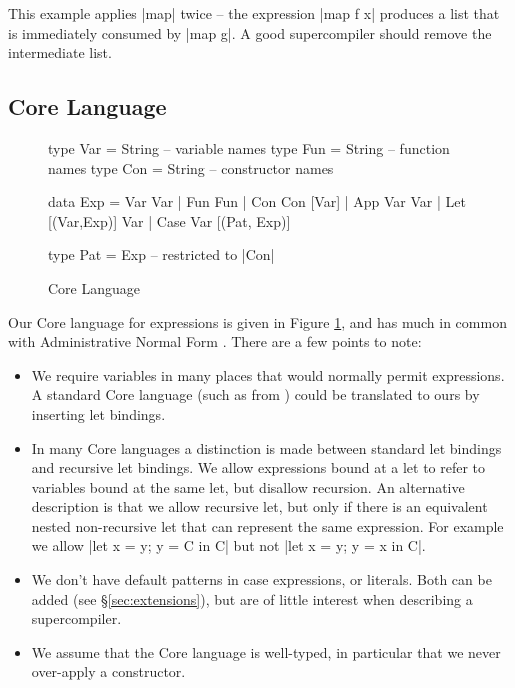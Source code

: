 \documentclass[draft]{sigplanconf}
\begin{document}
This example applies |map| twice -- the expression |map f x| produces a list that is immediately consumed by |map g|. A good supercompiler should remove the intermediate list.

\subsection{Core Language}
\label{sec:core}

\begin{figure}
\begin{code}
type Var   =   String -- variable names
type Fun   =   String -- function names
type Con   =   String -- constructor names

data Exp   =   Var Var
           |   Fun Fun
           |   Con Con [Var]
           |   App Var Var
           |   Let [(Var,Exp)] Var
           |   Case Var [(Pat, Exp)]

type Pat   =   Exp -- restricted to |Con|
\end{code}
\caption{Core Language}
\label{fig:core}
\end{figure}

Our Core language for expressions is given in Figure \ref{fig:core}, and has much in common with Administrative Normal Form \cite{flanagan:continuations}. There are a few points to note:

\begin{itemize}
\item We require variables in many places that would normally permit expressions. A standard Core language (such as from \citet{ghc_core}) could be translated to ours by inserting let bindings.
\item In many Core languages a distinction is made between standard let bindings and recursive let bindings. We allow expressions bound at a let to refer to variables bound at the same let, but disallow recursion. An alternative description is that we allow recursive let, but only if there is an equivalent nested non-recursive let that can represent the same expression. For example we allow |let x = y; y = C in C| but not |let x = y; y = x in C|.
\item We don't have default patterns in case expressions, or literals. Both can be added (see \S\ref{sec:extensions}), but are of little interest when describing a supercompiler.
\item We assume that the Core language is well-typed, in particular that we never over-apply a constructor.
\end{itemize}
\end{document}
